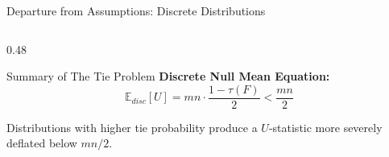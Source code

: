 \documentclass[8pt]{beamer}
\begin{document}
\begin{frame}{Departure from Assumptions: Discrete Distributions}
\begin{columns}[T]
\begin{column}{0.48\textwidth}
\begin{block}{Summary of The Tie Problem}
                \vspace{0.2cm}
                \textbf{Discrete Null Mean Equation:}
                \begin{equation*}
                    \mathbb{E}_{disc}[U] = mn \cdot \frac{1 - \tau(F)}{2} < \frac{mn}{2}
                \end{equation*}
                
                \vspace{0.1cm}
                Distributions with higher tie probability produce a $U$-statistic more severely deflated below $mn/2$.
            \end{block}
        \end{column}
    \end{columns}
\end{frame}
\end{document}
